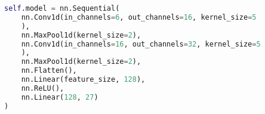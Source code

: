 \begin{lstlisting}[language=Python, caption={CNN architecture}]
self.model = nn.Sequential(
	nn.Conv1d(in_channels=6, out_channels=16, kernel_size=5
	),
	nn.MaxPool1d(kernel_size=2),
	nn.Conv1d(in_channels=16, out_channels=32, kernel_size=5
	),
	nn.MaxPool1d(kernel_size=2),
	nn.Flatten(),
	nn.Linear(feature_size, 128),
	nn.ReLU(),
	nn.Linear(128, 27)
)
\end{lstlisting}
